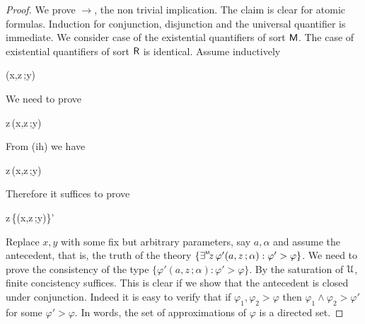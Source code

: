 \documentclass[10pt,oneside]{amsproc}
\begin{document}
\begin{proof}
  We prove $\rightarrow$, the non trivial implication.
  The claim is clear for atomic formulas.
  Induction for conjunction, disjunction and the universal quantifier is immediate.
%
%
%
%
%
  We consider case of the existential quantifiers of sort ${\sf M}$.
  The case of existential quantifiers of sort ${\sf R}$ is identical.
  Assume inductively
  
  {\rightarrow}
  {\varphi(x,z\,;y)}

  We need to prove

  {\rightarrow}
  {\existsM z\,\varphi(x,z\,;y)}

  From (ih) we have

  {\rightarrow}
  {\existsM z\,\varphi(x,z\,;y)}

  Therefore it suffices to prove

  {\rightarrow}
  {\existsM z\,\{\varphi(x,z\,;y)\}'}

Replace $x,y$ with some fix but arbitrary parameters, say $a,\alpha$ and assume the antecedent, that is, the truth of the theory $\{\existsM z\,\varphi'(a,z\,;\alpha):\varphi'>\varphi\}$.
We need to prove the consistency of the type $\{\varphi'(a,z\,;\alpha):\varphi'>\varphi\}$.
By the saturation of ${\EuScript U}$, finite concistency suffices.
This is clear if we show that the antecedent is closed under conjunction.
Indeed it is easy to verify that if $\varphi_1,\varphi_2>\varphi$ then $\varphi_1\wedge\varphi_2>\varphi'$ for some $\varphi'>\varphi$.
In words, the set of approximations of $\varphi$ is a directed set.
%
%
%
%
%
\end{proof}
\end{document}
